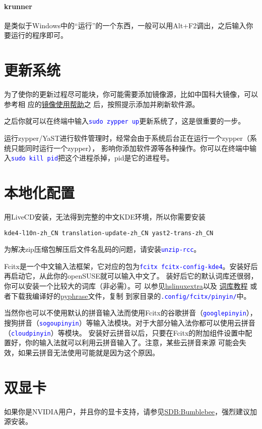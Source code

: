 \documentclass[10pt,openany]{book}
\newcommand{\command}[1]{\texttt{\textcolor{blue}{#1}}}
\newcommand{\soft}[1]{\texttt{\textcolor{blue}{#1}}}
\begin{document}
\paragraph{krunner} 是类似于Windows中的“运行”的一个东西，一般可以用Alt+F2调出，之后输入你要运行的程序即可。

\section{更新系统}
为了使你的更新过程尽可能块，你可能需要添加镜像源，比如中国科大镜像，可以参考相
应的\href{https://lug.ustc.edu.cn/wiki/mirrors/help/opensuse}{镜像使用帮助}之
后，按照提示添加并刷新软件源。

之后你就可以在终端中输入\command{sudo zypper up}更新系统了，这是很重要的一步。

运行zypper/YaST进行软件管理时，经常会由于系统后台正在运行一个zypper（系统只能同时运行一个zypper），
影响你添加软件源等各种操作。你可以在终端中输入\command{sudo kill pid}把这个进程杀掉，pid是它的进程号。

\section{本地化配置}
用LiveCD安装，无法得到完整的中文KDE环境，所以你需要安装
\begin{Verbatim}[formatcom=\color{codecolor}]
    kde4-l10n-zh_CN translation-update-zh_CN yast2-trans-zh_CN
\end{Verbatim}

为解决zip压缩包解压后文件名乱码的问题，请安装\soft{unzip-rcc}。

Fcitx是一个中文输入法框架，它对应的包为\soft{fcitx fcitx-config-kde4}。安装好后再启动它，从此你的openSUSE就可以输入中文了。
装好后它的默认词库还很弱，你可以安装一个比较大的词库（非必需）。可%
以参见\href{https://code.google.com/p/hslinuxextra/}{hs\-linux\-extra}以及%
\href{https://www.librehat.com/fcitx-sogou-pinyin-cell-database-convert-import-guide/}{词库教程}%
或者下载我编译好的\href{http://pan.baidu.com/s/1i3HtJ4T}{pyphrase}文件，复制
到家目录的\command{.config/fcitx/pinyin/}中。

当然你也可以不使用默认的拼音输入法而使用Fcitx的谷歌拼音（\soft{goo\-gle\-pin\-yin}），
搜狗拼音（\soft{so\-gou\-pin\-yin}）等输入法模块。对于大部分输入法你都可以使用云拼音（\soft{cloud\-pin\-yin}）等模块。
安装好云拼音以后，只要在Fcitx的附加组件设置中配置好，你的输入法就可以利用云拼音输入了。注意，某些云拼音来源
可能会失效，如果云拼音无法使用可能就是因为这个原因。
\section[双显卡]{双显卡}
如果你是NVIDIA用户，并且你的显卡支持，请参见\href{https://zh.opensuse.org/SDB:Bumblebee}{SDB:Bumblebee}，强烈建议加源安装。
\end{document}
